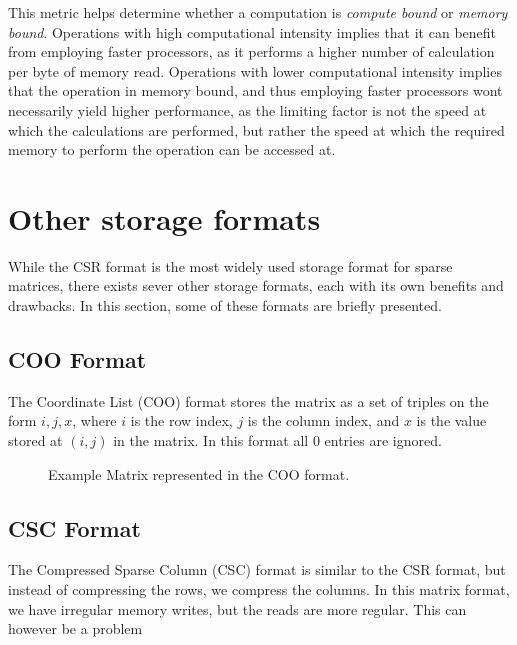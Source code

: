 This metric helps determine whether a computation is \textit{compute bound} or \textit{memory bound}. Operations with high computational intensity implies that it can benefit from employing faster processors, as it performs a higher number of calculation per byte of memory read. Operations with lower computational intensity implies that the operation in memory bound, and thus employing faster processors wont necessarily yield higher performance, as the limiting factor is not the speed at which the calculations are performed, but rather the speed at which the required memory to perform the operation can be accessed at.


\section{Other storage formats}
While the CSR format is the most widely used storage format for sparse matrices, there exists sever other storage formats, each with its own benefits and drawbacks. In this section, some of these formats are briefly presented.

\subsection{COO Format}
The Coordinate List (COO) format stores the matrix as a set of triples on the form \(i,j,x\), where \(i\) is the row index, \(j\) is the column index, and \(x\) is the value stored at \((i,j)\) in the matrix. In this format all \(0\) entries are ignored.

\begin{figure}[H]
    \centering
    \caption{Example Matrix represented in the COO format.}
    \label{fig:cooformat}
\end{figure}


\subsection{CSC Format}
The Compressed Sparse Column (CSC) format is similar to the CSR format, but instead of compressing the rows, we compress the columns. In this matrix format, we have irregular memory writes, but the reads are more regular. This can however be a problem

